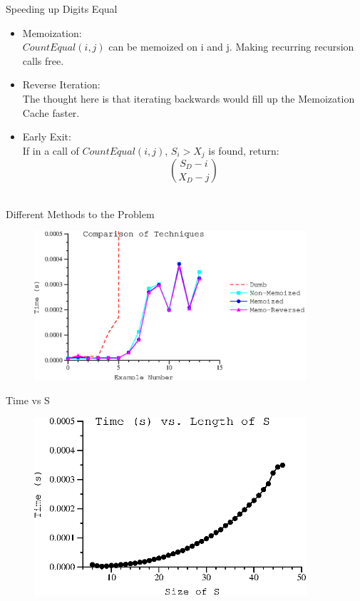 \documentclass[10pt]{beamer}
\begin{document}
\begin{frame}{Speeding up Digits Equal}
  \begin{itemize}
    \item Memoization: \\
      $CountEqual(i, j)$ can be memoized on i and j.
      Making recurring recursion calls free.
    \item Reverse Iteration: \\
      The thought here is that iterating backwards would fill up the Memoization Cache faster.
    \item Early Exit: \\
      If in a call of $CountEqual(i, j)$, $S_{i} > X_{j}$ is found, return:\\
      \begin{equation*}
        \binom{S_{D} - i}{X_{D} - j}
      \end{equation*}\\
  \end{itemize}
\end{frame}


\begin{frame}{Different Methods to the Problem}
  \begin{figure}[ht!]
    \centering
    \includegraphics[width=0.9\textwidth]{../figures/comparison.ps}
  \end{figure}
\end{frame}

\begin{frame}{Time vs S}
  \begin{figure}[ht!]
    \centering
    \includegraphics[width=0.9\textwidth]{../figures/vary_s.ps}
  \end{figure}
\end{frame}
\end{document}
